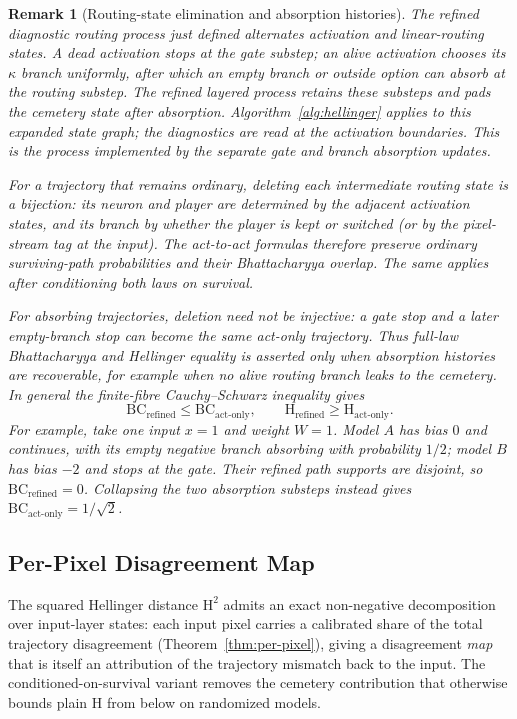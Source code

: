 \documentclass[twoside]{article}
\newcommand{\1}{\mathbf{1}}
\newtheorem{remark}{Remark}
\begin{document}
\begin{remark}[Routing-state elimination and absorption histories]\label{rem:rg-natural-equivalence}
The refined diagnostic routing process just defined alternates activation and linear-routing states.
A dead activation stops at the gate substep; an alive activation chooses its
$\kappa$ branch uniformly, after which an empty branch or outside option can
absorb at the routing substep. The refined layered process retains these
substeps and pads the cemetery state after absorption. Algorithm~\ref{alg:hellinger}
applies to this expanded state graph; the diagnostics are read at the activation
boundaries. This is the process implemented by the separate gate and branch
absorption updates.

For a trajectory that remains ordinary, deleting each intermediate routing
state is a bijection: its neuron and player are determined by the adjacent
activation states, and its branch by whether the player is kept or switched
(or by the pixel-stream tag at the input). The act-to-act formulas therefore
preserve ordinary surviving-path probabilities and their Bhattacharyya overlap.
The same applies after conditioning both laws on survival.

For absorbing trajectories, deletion need not be injective: a gate stop and a
later empty-branch stop can become the same act-only trajectory. Thus full-law
Bhattacharyya and Hellinger equality is asserted only when absorption histories
are recoverable, for example when no alive routing branch leaks to the cemetery.
In general the finite-fibre Cauchy--Schwarz inequality gives
\[
 \mathrm{BC}_{\mathrm{refined}}\leq\mathrm{BC}_{\mathrm{act\text{-}only}},
 \qquad
 \mathrm{H}_{\mathrm{refined}}\geq\mathrm{H}_{\mathrm{act\text{-}only}}.
\]
For example, take one input $x=1$ and weight $W=1$. Model $A$ has bias $0$ and
continues, with its empty negative branch absorbing with probability $1/2$;
model $B$ has bias $-2$ and stops at the gate. Their refined path supports are
disjoint, so $\mathrm{BC}_{\mathrm{refined}}=0$. Collapsing the two absorption
substeps instead gives $\mathrm{BC}_{\mathrm{act\text{-}only}}=1/\sqrt2$.
\end{remark}

\subsection{Per-Pixel Disagreement Map}\label{sec:lmp-disagreement}

The squared Hellinger distance $\mathrm{H}^2$ admits an exact non-negative decomposition over
input-layer states: each input pixel carries a calibrated share of the total trajectory
disagreement (Theorem~\ref{thm:per-pixel}), giving a disagreement \emph{map} that is itself an
attribution of the trajectory mismatch back to the input. The conditioned-on-survival variant
removes the cemetery contribution that otherwise bounds plain $\mathrm{H}$ from below on randomized
models.
\end{document}
